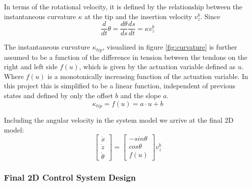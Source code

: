 In terms of the rotational velocity, it is defined by the relationship between the instantaneous curvature $\kappa$ at the tip and the insertion velocity $v_z^b$. Since 
\begin{equation}
    \frac{d}{dt}\theta  = \frac{d\theta}{ds}\frac{ds}{dt}=\kappa v_z^b
\end{equation}

The instantaneous curvature $\kappa_{tip}$, visualized in figure \ref{fig:curvature} is further assumed to be a function of the difference in tension between the tendons on the right and left side $f(u)$, which is given by the actuation variable defined as $u$. Where $f(u)$ is a monotonically increasing function of the actuation variable. In this project this is simplified to be a linear function, independent of previous states and defined by only the offset $b$ and the slope $a$. 
\begin{equation}
	\kappa_{tip} = f(u) = a\cdot u + b
\end{equation}

Including the angular velocity in the system model we arrive at the final 2D model:
\begin{equation}
	\begin{bmatrix}
		\dot{x} \\ \dot{z} \\ \dot{\theta}
	\end{bmatrix} = \begin{bmatrix}
	-sin\theta \\ cos\theta \\ f(u)
	\end{bmatrix}v_z^b
\end{equation}



\subsubsection{Final 2D Control System Design}

